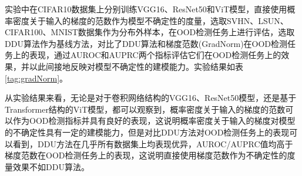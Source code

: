 实验中在CIFAR10数据集上分别训练VGG16、ResNet50和ViT模型，直接使用概率密度关于输入的梯度的范数作为模型不确定性的度量，选取SVHN、LSUN、CIFAR100、MNIST数据集作为分布外样本，在OOD检测任务上进行评估，选取DDU算法作为基线方法，对比了DDU算法和梯度范数(GradNorm)在OOD检测任务上的表现，通过AUROC和AUPRC两个指标评估它们在OOD检测任务上的效果，并以此间接地反映对模型不确定性的建模能力。实验结果如表\ref{tag:gradNorm}。
\begin{table}[h]
    \captionsetup{font=small, justification=centering}
    \centering
    \renewcommand{\arraystretch}{1.0} %
    \caption{在CIFAR10上训练不同的模型(VGG16、ResNet50、ViT)，选取SVHN、LSUN、CIFAR100、MNIST作为OOD样本，对比DDU算法和梯度范数(GradNorm)对模型不确定性的建模效果，报告指标是AUROC($\uparrow$) / AUPRC($\uparrow$)}
    \label{tag:gradNorm}
\end{table}


从实验结果来看，无论是对于卷积网络结构的VGG16、ResNet50模型，还是基于Transformer结构的ViT模型，都可以观察到，概率密度关于输入的梯度的范数可以作为OOD检测指标并具有良好的表现，这说明概率密度关于输入的梯度对模型的不确定性具有一定的建模能力，但是对比DDU方法对OOD检测任务上的表现可以看到，DDU方法在几乎所有数据集上均表现优异，AUROC/AUPRC值均高于梯度范数在OOD检测任务上的表现，这说明直接使用梯度范数作为不确定性的度量效果不如DDU算法。

